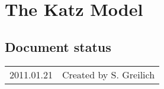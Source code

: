 \chapter{The Katz Model}

\section*{Document status}
\begin{tabular}{l l}
2011.01.21&Created by S. Greilich
\end{tabular} 